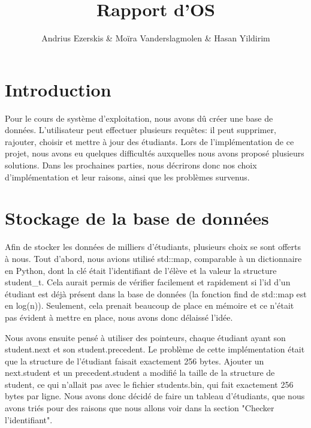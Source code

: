 \documentclass[utf8]{article}
\begin{document}
\begin{titlepage}
    

\author{Andrius Ezerskis \& Moïra Vanderslagmolen \& Hasan Yildirim}
\title{Rapport d'OS}

\maketitle
\end{titlepage}

\section{Introduction}
\par
Pour le cours de système d'exploitation, nous avons dû créer une base de données. 
L'utilisateur peut effectuer plusieurs requêtes: il peut supprimer, rajouter, choisir
et mettre à jour des étudiants. Lors de l'implémentation de ce projet, nous avons eu quelques difficultés
auxquelles nous avons proposé plusieurs solutions. Dans les prochaines parties, nous décrirons donc
nos choix d'implémentation et leur raisons, ainsi que les problèmes survenus.
\par


\section{Stockage de la base de données}
\indent{}
\par
Afin de stocker les données de milliers d'étudiants, plusieurs choix se sont offerts à nous. 
Tout d'abord, nous avions utilisé std::map, comparable à un dictionnaire en Python, dont la clé était l'identifiant de l'élève et la valeur la structure student\_t. 
Cela aurait permis de vérifier facilement et rapidement si l'id d'un étudiant est déjà présent dans la base de données (la fonction find de std::map est en log(n)).
Seulement, cela prenait beaucoup de place en mémoire et ce n'était pas évident à mettre en place, nous avons donc délaissé l'idée. 
\par
\indent{}
\par
Nous avons ensuite pensé à utiliser des pointeurs, chaque étudiant
ayant son student.next et son student.precedent. Le problème de cette implémentation était que la structure de l'étudiant faisait exactement 256 bytes.
Ajouter un next.student et un precedent.student a modifié la taille de la structure de student, ce qui n'allait pas avec le fichier students.bin, qui fait exactement 256 bytes par ligne.
Nous avons donc décidé de faire un tableau d'étudiants, que nous avons triés pour des raisons que nous allons voir dans la section "Checker l'identifiant".
\par
\end{document}
